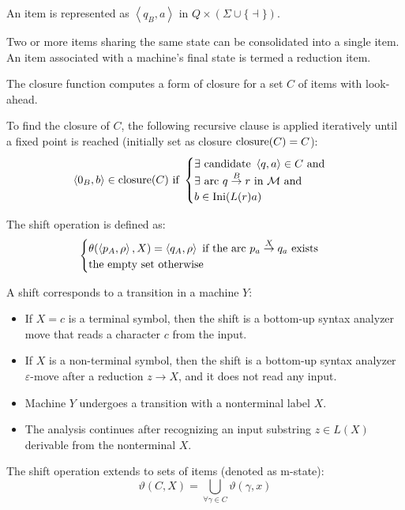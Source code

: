 \begin{definition}
    An item is represented as $\left\langle q_B,a\right\rangle$ in $Q \times (\Sigma \cup \{\dashv\})$.
\end{definition}
Two or more items sharing the same state can be consolidated into a single item. 
An item associated with a machine's final state is termed a reduction item.
\begin{definition}
    The closure function computes a form of closure for a set $C$ of items with look-ahead.
\end{definition}
To find the closure of $C$, the following recursive clause is applied iteratively until a fixed point is reached (initially set as closure $\textnormal{closure}(C)=C$): 
\[\left\langle 0_B,b\right\rangle \in \textnormal{closure}(C) \textnormal{ if }
\begin{cases}
    \exists \textnormal{ candidate } \left\langle q,a\right\rangle \in C \textnormal{ and} \\
    \exists \textnormal{ arc } q \overset{B}{\rightarrow} r \textnormal{ in } \mathcal{M} \textnormal{ and} \\
    b \in \textnormal{Ini}(L(r)a)
\end{cases}\]
\begin{definition}
    The shift operation is defined as: 
    \[\begin{cases}
        \theta(\left\langle p_A,\rho\right\rangle,X)=\left\langle q_A,\rho\right\rangle \textnormal{ if the arc } p_a \overset{X}{\rightarrow} q_a \textnormal{ exists} \\
        \textnormal{the empty set otherwise}
    \end{cases}\]
\end{definition}
A shift corresponds to a transition in a machine $Y$: 
\begin{itemize}
    \item If $X=c$ is a terminal symbol, then the shift is a bottom-up syntax analyzer move that reads a character $c$ from the input.
    \item If $X$ is a non-terminal symbol, then the shift is a bottom-up syntax analyzer $\varepsilon$-move after a reduction $z \rightarrow X$, and it does not read any input.
    \item Machine $Y$ undergoes a transition with a nonterminal label $X$. 
    \item The analysis continues after recognizing an input substring $z \in L (X)$ derivable from the nonterminal $X$. 
\end{itemize}
The shift operation extends to sets of items (denoted as m-state): 
\[\vartheta(C,X)=\bigcup_{\forall \gamma \in C} \vartheta(\gamma,x)\]

